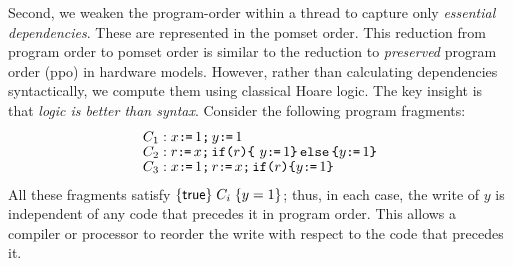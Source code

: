 Second, we weaken the program-order within a thread to capture only
\emph{essential dependencies}.  These are represented in the pomset order.
This reduction from program order to pomset order is similar to the reduction
to \emph{preserved} program order (\textsf{ppo}) in hardware models.  However, rather
than calculating dependencies syntactically, we compute them using 
classical Hoare logic. The key insight is that \emph{logic is better than syntax}.
Consider the following program fragments: \begingroup \allowdisplaybreaks
\begin{align*}
  & C_1: x \texttt{:}\mkern-1mu\texttt{=}\, 1 \texttt{;}\,\allowbreak y \texttt{:}\mkern-1mu\texttt{=}\, 1
  \\[-1ex] & C_2: r \texttt{:}\mkern-1mu\texttt{=}\, x \texttt{;}\,\allowbreak \texttt{if}\allowbreak\texttt{(}r\texttt{)} \allowbreak\texttt{\{}\ y \texttt{:}\mkern-1mu\texttt{=}\, 1 \texttt{\}}\,\allowbreak\texttt{else}\allowbreak\,\texttt{\{} y \texttt{:}\mkern-1mu\texttt{=}\, 1  \texttt{\}}
  \\[-1ex] & C_3: x \texttt{:}\mkern-1mu\texttt{=}\, 1 \texttt{;}\,\allowbreak r \texttt{:}\mkern-1mu\texttt{=}\, x \texttt{;}\,\allowbreak \texttt{if}\allowbreak\texttt{(}r\texttt{)} \allowbreak\texttt{\{} y \texttt{:}\mkern-1mu\texttt{=}\, 1 \texttt{\}}
\end{align*}
\endgroup
All these fragments satisfy  $\{\mathsf{true}\}\allowbreak\;C_i\;\allowbreak\{y =1\}$; thus, in each case, the write of $y$ is independent of
any code that precedes it in program order.  This allows a compiler or processor to reorder the write with respect to the code that precedes it.



